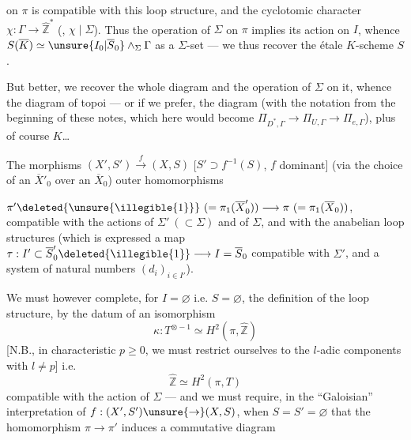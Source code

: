 
   on $\pi$ is
compatible with this loop structure,
and the cyclotomic character $\chi:\Gamma\to\widehat{\mathbb Z}^{*}$
(, $\chi\mid\Sigma$). Thus the operation of
$\Sigma$ on $\pi$ implies its action on $I$, whence
$S(\overline K)\simeq\unsure{I_0|\overline S_0}\wedge_{\Sigma}\Gamma$ as a $\Sigma$-set
--- we thus recover the étale $K$-scheme $S$.

But better, we recover the whole
diagram
and the operation of $\Sigma$ on it, whence the
diagram of topoi  --- or if
we prefer, the diagram
(with the notation from the beginning of these notes,
which here would become $\Pi_{D^{*},\Gamma}\to\Pi_{U,\Gamma}\to\Pi_{e,\Gamma}$),
plus of course $K$\dots

The morphisms $(X',S')\xrightarrow{f}(X,S)$
[$S'\supset f^{-1}(S)$, $f$ dominant]  
  (via the choice of an $\overline X'_0$
over an $\overline X_0$)   outer homomorphisms



$\pi'\deleted{\unsure{\illegible{1}}}\ (=\pi_1(\overline X'_0))\longrightarrow\pi\ (=\pi_1(\overline X_0))$, compatible
with the actions of $\Sigma'\ (\subset\Sigma)$ and of $\Sigma$,
and with the anabelian loop structures
(which is expressed   a map
$\tau:I'\subset\overline S'_0\deleted{\illegible{1}}\longrightarrow I=\overline S_0$ compatible with
$\Sigma'$, and a system of natural numbers
$(d_i)_{i\in I'}$).

We must however complete,  for
$I=\varnothing$ i.e. $S=\varnothing$, the definition of the
loop structure, by the datum of an
isomorphism
\[
\kappa:T^{\otimes-1}\simeq H^2(\pi,\widehat{\mathbb Z})
\]
[N.B., in characteristic $p\geq0$, we must restrict ourselves
to the $l$-adic components with $l\ne p$]
i.e.
\[
\widehat{\mathbb Z}\simeq H^2(\pi,T)
\]
compatible with the action of $\Sigma$
--- and we must require, in the
``Galoisian'' interpretation of $f:(X',S')\unsure{\to}(X,S)$, when $S=S'=\varnothing$
that the homomorphism $\pi\to\pi'$ induces a
commutative diagram

